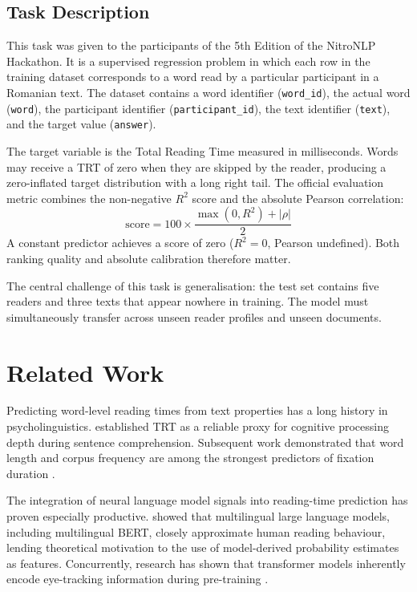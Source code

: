 \documentclass[12pt]{article}
\begin{document}
\subsection{Task Description}

This task was given to the participants of the 5th Edition of the NitroNLP Hackathon. It is a supervised regression problem in which each row in the training dataset corresponds to a word read by a particular participant in a Romanian text. The dataset contains a word identifier (\texttt{word\_id}), the actual word (\texttt{word}), the participant identifier (\texttt{participant\_id}), the text identifier (\texttt{text}), and the target value (\texttt{answer}).

The target variable is the Total Reading Time measured in milliseconds. Words may receive a TRT of zero when they are skipped by the reader, producing a zero-inflated target distribution with a long right tail. The official evaluation metric combines the non-negative $R^2$ score and the absolute Pearson correlation:
\[
  \text{score} = 100 \times \frac{\max(0, R^2) + |\rho|}{2}
\]
A constant predictor achieves a score of zero ($R^2 = 0$, Pearson undefined). Both ranking quality and absolute calibration therefore matter.

The central challenge of this task is generalisation: the test set contains five readers and three texts that appear nowhere in training. The model must simultaneously transfer across unseen reader profiles and unseen documents.

\section{Related Work}

Predicting word-level reading times from text properties has a long history in psycholinguistics. \citet{frazier1982making} established TRT as a reliable proxy for cognitive processing depth during sentence comprehension. Subsequent work demonstrated that word length and corpus frequency are among the strongest predictors of fixation duration \cite{hodivoianu2025predicting}.

The integration of neural language model signals into reading-time prediction has proven especially productive. \citet{hollenstein2021multilingual} showed that multilingual large language models, including multilingual BERT, closely approximate human reading behaviour, lending theoretical motivation to the use of model-derived probability estimates as features. Concurrently, research has shown that transformer models inherently encode eye-tracking information during pre-training \cite{dini2025human}.
\end{document}
